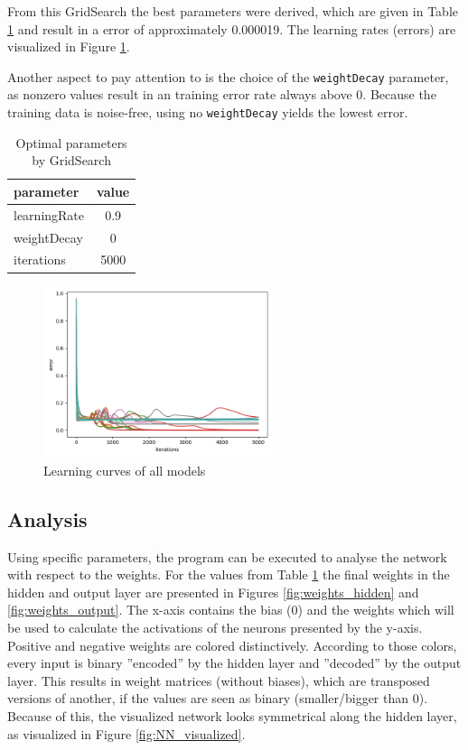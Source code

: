 \documentclass{article}
\begin{document}
From this GridSearch the best parameters were derived, which are given in Table \ref{tab:opt_params} and result in a error of approximately 0.000019. The learning rates (errors) are visualized in Figure \ref{fig:gs_errors}.

Another aspect to pay attention to is the choice of the \texttt{weightDecay} parameter, as nonzero values result in an training error rate always above 0. Because the training data is noise-free, using no \texttt{weightDecay} yields the lowest error.

\begin{table}
    \centering
    \begin{tabular}{l|c}
        parameter & value \\
        \hline
        learningRate & 0.9 \\
        weightDecay & 0 \\
        iterations & 5000 \\
    \end{tabular}
    \caption{Optimal parameters by GridSearch}
    \label{tab:opt_params}
\end{table}

\begin{figure}
    \centering
    \includegraphics[width=0.6\textwidth]{gs_errors.png}
    \caption{Learning curves of all models}
    \label{fig:gs_errors}
\end{figure}

\subsection{Analysis}

Using specific parameters, the program can be executed to analyse the network with respect to the weights. For the values from Table \ref{tab:opt_params} the final weights in the hidden and output layer are presented in Figures \ref{fig:weights_hidden} and \ref{fig:weights_output}. The x-axis contains the bias (0) and the weights which will be used to calculate the activations of the neurons presented by the y-axis. Positive and negative weights are colored distinctively. According to those colors, every input is binary ''encoded'' by the hidden layer and ''decoded'' by the output layer. This results in weight matrices (without biases), which are transposed versions of another, if the values are seen as binary (smaller/bigger than 0). Because of this, the visualized network looks symmetrical along the hidden layer, as visualized in Figure \ref{fig:NN_visualized}.
\end{document}
